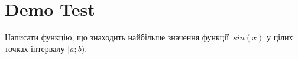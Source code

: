 \documentclass[12pt]{article}
\begin{document}
\section*{Demo Test}

Написати функцію, що знаходить найбільше значення функції~$sin(x)$ у цілих точках інтервалу $[a; b)$.


\end{document}
